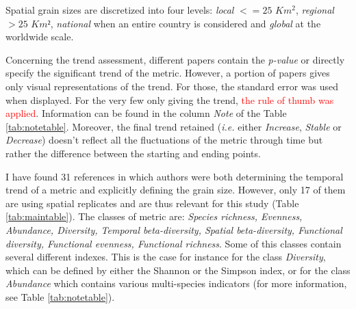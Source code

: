 \documentclass[
  12pt,
  oneside]{report}
\begin{document}
Spatial grain sizes are discretized into four levels: \emph{local} \(<= 25\) \(Km^2\), \emph{regional} \(> 25\) \(Km²\), \emph{national} when an entire country is considered and \emph{global} at the worldwide scale.

Concerning the trend assessment, different papers contain the \emph{p-value} or directly specify the significant trend of the metric. However, a portion of papers gives only visual representations of the trend. For those, the standard error was used when displayed. For the very few only giving the trend, \textcolor{red}{the rule of thumb was applied}. Information can be found in the column \emph{Note} of the Table \ref{tab:notetable}. Moreover, the final trend retained (\emph{i.e.} either \emph{Increase}, \emph{Stable} or \emph{Decrease}) doesn't reflect all the fluctuations of the metric through time but rather the difference between the starting and ending points.

I have found 31 references in which authors were both determining the temporal trend of a metric and explicitly defining the grain size. However, only 17 of them are using spatial replicates and are thus relevant for this study (Table \ref{tab:maintable}). The classes of metric are: \emph{Species richness, Evenness, Abundance, Diversity, Temporal beta-diversity, Spatial beta-diversity, Functional diversity, Functional evenness, Functional richness}. Some of this classes contain several different indexes. This is the case for instance for the class \emph{Diversity}, which can be defined by either the Shannon or the Simpson index, or for the class \emph{Abundance} which contains various multi-species indicators (for more information, see Table \ref{tab:notetable}).
\end{document}
